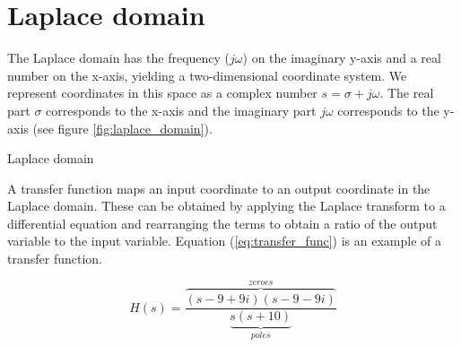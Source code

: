 \section{Laplace domain}

The Laplace domain has the frequency ($j\omega$) on the imaginary y-axis and a
real number on the x-axis, yielding a two-dimensional coordinate system. We
represent coordinates in this space as a complex number $s = \sigma + j\omega$.
The real part $\sigma$ corresponds to the x-axis and the imaginary part
$j\omega$ corresponds to the y-axis (see figure \ref{fig:laplace_domain}).

\begin{bookfigure}

  \caption{Laplace domain}
  \label{fig:laplace_domain}
\end{bookfigure}

A transfer function maps an input coordinate to an output coordinate in the
Laplace domain. These can be obtained by applying the Laplace transform to a
differential equation and rearranging the terms to obtain a ratio of the output
variable to the input variable. Equation (\ref{eq:transfer_func}) is an example
of a transfer function.

\begin{equation} \label{eq:transfer_func}
  H(s) = \frac{\overbrace{(s-9+9i)(s-9-9i)}^{zeroes}}
    {\underbrace{s(s+10)}_{poles}}
\end{equation}
